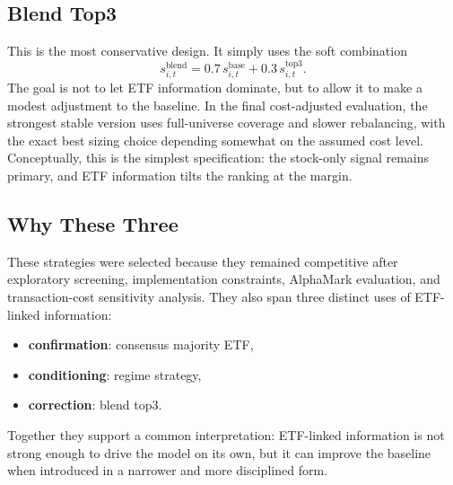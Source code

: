 \subsection{Blend Top3}

This is the most conservative design. It simply uses the soft combination
\[
s^{\mathrm{blend}}_{i,t} = 0.7\, s^{\mathrm{base}}_{i,t} + 0.3\, s^{\mathrm{top3}}_{i,t}.
\]
The goal is not to let ETF information dominate, but to allow it to make a modest adjustment to the baseline. In the final cost-adjusted evaluation, the strongest stable version uses full-universe coverage and slower rebalancing, with the exact best sizing choice depending somewhat on the assumed cost level. Conceptually, this is the simplest specification: the stock-only signal remains primary, and ETF information tilts the ranking at the margin.

\subsection{Why These Three}

These strategies were selected because they remained competitive after exploratory screening, implementation constraints, AlphaMark evaluation, and transaction-cost sensitivity analysis. They also span three distinct uses of ETF-linked information:
\begin{itemize}[leftmargin=1.4em]
  \item \textbf{confirmation}: consensus majority ETF,
  \item \textbf{conditioning}: regime strategy,
  \item \textbf{correction}: blend top3.
\end{itemize}

Together they support a common interpretation: ETF-linked information is not strong enough to drive the model on its own, but it can improve the baseline when introduced in a narrower and more disciplined form.
